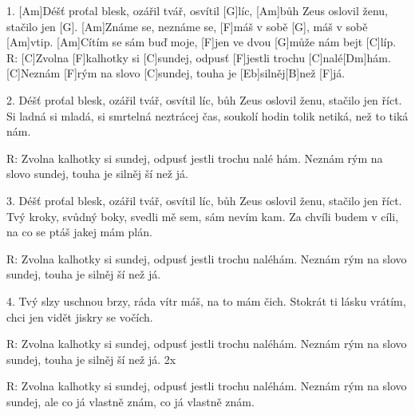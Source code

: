 
1. [Am]Déšť proťal blesk, ozářil tvář, osvítil [G]líc,
[Am]bůh Zeus oslovil ženu, stačilo jen [G].
[Am]Známe se, neznáme se, [F]máš v sobě [G], máš v sobě [Am]vtip.
[Am]Cítím se sám buď moje, [F]jen ve dvou [G]může nám bejt [C]líp.
R: [C]Zvolna [F]kalhotky si [C]sundej, odpusť [F]jestli trochu [C]nalé[Dm]hám.
[C]Neznám [F]rým na slovo [C]sundej, touha je [Eb]silněj[B] než [F]já.

2. Déšť proťal blesk, ozářil tvář, osvítil  líc,
bůh Zeus oslovil ženu, stačilo jen  říct.
Si ladná si mladá, si smrtelná  neztrácej  čas,
soukolí hodin tolik  netiká, než to tiká  nám.

R: Zvolna  kalhotky si  sundej, odpusť  jestli trochu  nalé  hám.
Neznám  rým na slovo  sundej, touha je  silněj  ší než  já.

3. Déšť proťal blesk, ozářil tvář, osvítil  líc,
bůh Zeus oslovil ženu, stačilo jen  říct.
Tvý kroky, svůdný boky,  svedli mě  sem, sám nevím kam.
Za chvíli budem v cíli,  na co se ptáš jakej mám plán.

R: Zvolna kalhotky si sundej, odpusť jestli trochu naléhám.
Neznám rým na slovo sundej, touha je silněj ší než já.

4. Tvý slzy uschnou brzy, ráda vítr máš, na to mám čich.
Stokrát ti lásku vrátím, chci jen vidět jiskry se vočích.

R: Zvolna kalhotky si sundej, odpusť jestli trochu naléhám.
Neznám rým na slovo sundej, touha je silněj ší než já. 2x

R: Zvolna kalhotky si sundej, odpusť jestli trochu naléhám.
Neznám rým na slovo sundej, ale co já vlastně znám, co já vlastně znám. 

